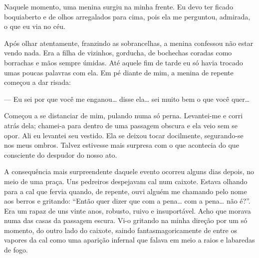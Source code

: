 Naquele momento, uma menina surgiu na minha frente. Eu devo ter ficado
boquiaberto e de olhos arregalados para cima, pois ela me perguntou,
admirada, o que eu via no céu.


Após olhar atentamente, franzindo as sobrancelhas, a menina confessou não
estar vendo nada. Era a filha de vizinhos, gorducha, de bochechas coradas
como borrachas e mãos sempre úmidas. Até aquele fim de tarde eu só havia
trocado umas poucas palavras com ela. Em pé diante de mim, a menina de
repente começou a dar risada:

--- Eu sei por que você me enganou\ldots{} disse ela\ldots{} sei muito bem o
    que você quer\ldots{}

Começou a se distanciar de mim, pulando numa só perna. Levantei-me e corri
atrás dela; chamei-a para dentro de uma passagem obscura e ela veio sem se
opor. Ali eu levantei seu vestido. Ela se deixou tocar docilmente,
segurando-se nos meus ombros. Talvez estivesse mais surpresa com o que
acontecia do que consciente do despudor do nosso ato.

A consequência mais surpreendente daquele evento ocorreu alguns dias depois,
no meio de uma praça. Uns pedreiros despejavam cal num caixote. Estava
olhando para a cal que fervia quando, de repente, ouvi alguém me chamando
pelo nome aos berros e gritando: ``Então quer dizer que com a pena\ldots
{} com a pena\ldots{} não é?''. Era um rapaz de uns vinte anos, robusto,
ruivo e insuportável. Acho que morava numa das casas da passagem escura. Vi-o
gritando na minha direção por um só momento, do outro lado do caixote, saindo
fantasmagoricamente de entre os vapores da cal como uma aparição infernal que
falava em meio a raios e labaredas de fogo.




